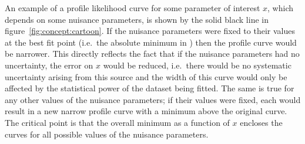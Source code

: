 An example of a profile likelihood curve for some parameter of interest $x$,
which depends on some nuisance parameters,
is shown by the solid black line in figure~\ref{fig:concept:cartoon}. If the
nuisance parameters were fixed to their values at the best fit point (i.e.~the
absolute minimum in \nll) then the profile \nll curve would be narrower.
This directly reflects the fact that
if the nuisance parameters had no uncertainty,
the error on $x$ would be reduced, i.e.~there would be no systematic
uncertainty arising from this source and the width of this curve would only
be affected by the statistical power of the dataset being fitted.
The same is true for any other values of the nuisance parameters; if their values
were fixed, each would result in a new narrow profile curve with a minimum above the original
curve. The critical point is that the overall minimum as a function
of $x$ encloses the curves for all possible values of the nuisance
parameters.

